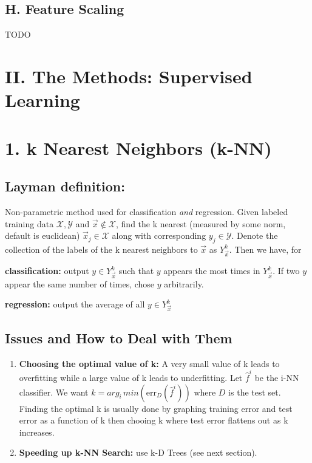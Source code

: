 \documentclass[10pt]{article}
\begin{document}
		\subsection*{H. Feature Scaling}
			TODO
			
			
\section*{II. The Methods: Supervised Learning}

\section*{1. k Nearest Neighbors (k-NN)}
	\subsection*{Layman definition:} 
	Non-parametric method used for classification \textit{and} regression. Given labeled training data
	$\mathcal{X}, \mathcal{Y} $ and $\vec{x} \not \in \mathcal{X}$, find the k nearest (measured by some norm, 
	default is euclidean) $ \vec{x}_j \in \mathcal{X} $ along with corresponding $y_j \in \mathcal{Y}$. Denote the 
	collection of the labels of the k nearest neighbors to $\vec x$ as $Y_{\vec x}^k $. Then we have, for 
	
	\indent \textbf{classification:} output $y \in Y_{\vec x}^k $ such that $y$ appears the most times in $Y_{\vec x}^k $. 
	\indent If two $y$ appear the same number of times, chose $y$ arbitrarily. 
	
	\indent \textbf{regression:} output the average of all $y \in  Y_{\vec x}^k  $ 
	
	\subsection*{Issues and How to Deal with Them}
		\begin{enumerate}
			\item \textbf{Choosing the optimal value of k: } A very small value of k leads to overfitting while a large
			value of k leads to underfitting. Let $\hat f^i$ be the i-NN classifier. We want 
			$k = arg_i \,min( \textrm{err}_D(\hat f^i) )$ where $D$ is the test set. Finding the optimal k
			is usually done by graphing training error and test error as a function of k then chooing k where test error
			flattens out as k increases. 
			\item \textbf{Speeding up k-NN Search:} use k-D Trees (see next section).
		\end{enumerate}
		
\end{document}
